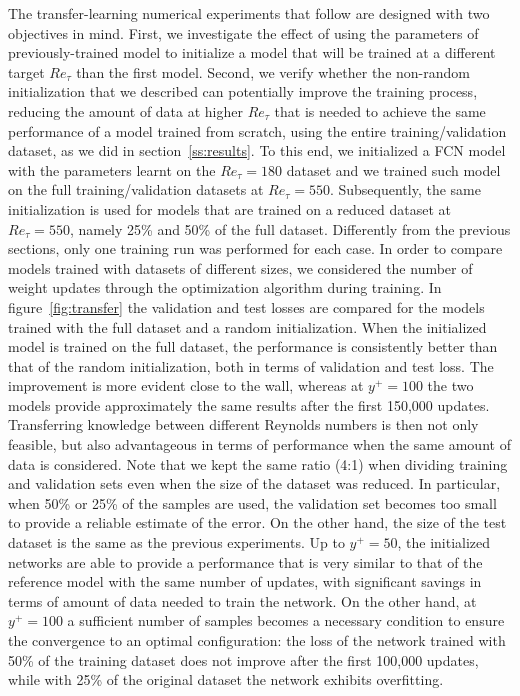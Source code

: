 The transfer-learning numerical experiments that follow are designed with two objectives in mind.
First, we investigate the effect of using the parameters of previously-trained model to initialize a model that will be trained at a different target $Re_{\tau}$ than the first model.
Second, we verify whether the non-random initialization that we described can potentially improve the training process, reducing the amount of data at higher $Re_{\tau}$ that is needed to achieve the same performance of a model trained from scratch, using the entire training/validation dataset, as we did in section~\ref{ss:results}.
To this end, we initialized a FCN model with the parameters learnt on the $Re_{\tau}=180$ dataset and we trained such model on the full training/validation datasets at $Re_{\tau}=550$.
Subsequently, the same initialization is used for models that are trained on a reduced dataset at $Re_{\tau}=550$, namely 25\% and 50\% of the full dataset.
Differently from the previous sections, only one training run was performed for each case.
In order to compare models trained with datasets of different sizes, we considered the number of weight updates through the optimization algorithm during training.
In figure~\ref{fig:transfer} the validation and test losses are compared for the models trained with the full dataset and a random initialization.
When the initialized model is trained on the full dataset, the performance is consistently better than that of the random initialization, both in terms of validation and test loss.
The improvement is more evident close to the wall, whereas at $y^+=100$ the two models provide approximately the same results after the first 150,000 updates.
Transferring knowledge between different Reynolds numbers is then not only feasible, but also advantageous in terms of performance when the same amount of data is considered.
Note that we kept the same ratio (4:1) when dividing training and validation sets even when the size of the dataset was reduced.
In particular, when 50\% or 25\% of the samples are used, the validation set becomes too small to provide a reliable estimate of the error.
On the other hand, the size of the test dataset is the same as the previous experiments.
Up to $y^+=50$, the initialized networks are able to provide a performance that is very similar to that of the reference model with the same number of updates, with significant savings in terms of amount of data needed to train the network.
On the other hand, at $y^+=100$ a sufficient number of samples becomes a necessary condition to ensure the convergence to an optimal configuration: the loss of the network trained with 50\% of the training dataset does not improve after the first 100,000 updates, while with 25\% of the original dataset the network exhibits overfitting.
